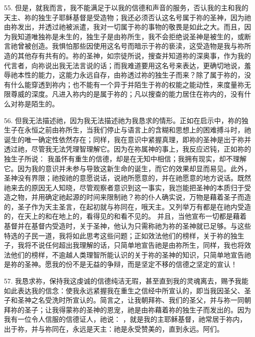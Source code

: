 55. 但是，就我而言，我不能满足于以我的信德和声音的服务，否认我的主和我的天主、祢的独生子耶稣基督是受造物；我还必须否认这名号属于祢的圣神，因为祂由祢发出，并透过祂被派遣，我对一切属于祢的事物的敬畏是如此之大。而且，因为我知道唯独祢是未生的，独生子是由祢所生，我不会拒绝说圣神是被生的，或断言祂曾被创造。我惧怕那些因使用这名号而暗示于祢的亵渎，这受造物是我与祢所造的其他存有共有的。祢的圣神，如宗徒所说，搜查并知道祢的深奥事，作为我的代言者，向祢说出我无法言说的话；而我难道要用这名号来表达，更确切地说，羞辱祂本性的能力，这能力永远自存，由祢透过祢的独生子而来？除了属于祢的，没有什么能穿透到祢内；也不能有一个异于并陌生于祢的权能之能动性，来度量祢无限尊威的深度。凡进入祢内的是属于祢的；凡以搜查的能力居住在祢内的，没有什么对祢是陌生的。\par

56. 但我无法描述祂，因为我无法描述祂为我恳求的情形。正如在启示中，祢的独生子在永恒之前由祢所生，当我们停止与语言上的含糊和思想上的困难搏斗时，祂诞生的唯一确定性依然存在；同样，我在意识中紧握真理，即祢的圣神是出于祢并透过祂，尽管我无法凭理智理解它。因为在祢属神的事上，我反应迟钝，正如祢的独生子所说：  我虽怀有重生的信德，却是在无知中相信；我拥有现实，却不理解它。因为我的意识并未参与导致这新生命的诞生，而它的效果却显而易见。此外，圣神没有界限；祂按祂的意愿说话，说祂所愿意的，并在祂愿意的地方说话。既然祂来去的原因无人知晓，尽管观察者意识到这一事实，我岂能把圣神的本质归于受造之物，并用确定祂起源的时间来限制祂？祢的仆人确实说，万物是藉着圣子而造的，圣子作为天主圣言，在起初就与祢同在，哦天主。又列举万有都是在祂内受造的，在天上的和在地上的，看得见的和看不见的。 并且，当他宣布一切都是藉着基督并在基督内受造时，关于圣神，他认为只需称祂为祢的圣神就已足够。与这些特选的子民一道，我将如此思考这些问题；正如效法他们的榜样，关于祢的独生子，我将不说任何超出我理解的话，只简单地宣告祂是由祢所生，同样，我也将效法他们的榜样，不逾越人类理智所能认识的关于祢的圣神的知识，只简单地宣告祂是祢的圣神。愿我的份不是无益的争辩，而是坚定不移的信德之坚定的宣认！\par

57. 我恳求祢，保持我这虔诚的信德纯洁无瑕，甚至直到我的灵魂离去，赐予我能如此表达我的信念：使我永远紧握我在重生之信经中所宣认的，即当我因圣父、圣子和圣神之名受洗时所宣认的。简言之，让我朝拜祢、我们的圣父，并与祢一同朝拜祢的圣子；让我得蒙祢的圣神的恩宠，祂是由祢藉着祢的独生子而发出的。因为我有一位令人信服的信德证人，祂说： ，就是我的主耶稣基督，祂常居于祢内，出于祢，并与祢同在，永远是天主：祂是永受赞美的，直到永远。阿们。\par

